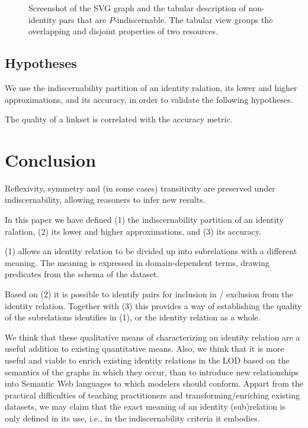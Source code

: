 \documentclass[letterpaper]{article}
\begin{document}
\begin{figure}
\label{fig:screenshot}
\caption{Screenshot of the SVG graph and the tabular description of non-identity pars that are $P$-indiscernable. The tabular view groups the overlapping and disjoint properties of two resources.}
\end{figure}

\subsection{Hypotheses}
\label{sec:hypotheses}

We use the indiscernability partition of an identity ralation, its lower and higher approximations, and its accuracy, in order to validate the following hypotheses.

The quality of a linkset is correlated with the accuracy metric.

\section{Conclusion}
\label{sec:conclusion}

Reflexivity, symmetry and (in some cases) transitivity are preserved under indiscernability, allowing reasoners to infer new results.

In this paper we have defined (1) the indiscernability partition of an identity ralation, (2) its lower and higher approximations, and (3) its accuracy.

(1) allows an identity relation to be divided up into subrelations with a different meaning. The meaning is expressed in domain-dependent terms, drawing predicates from the schema of the dataset.

Based on (2) it is possible to identify pairs for inclusion in / exclusion from the identity relation. Together with (3) this provides a way of establishing the quality of the subrelations identifies in (1), or the identity relation as a whole.

We think that these qualitative means of characterizing an identity relation are a useful addition to existing quantitative means. Also, we think that it is more useful and viable to enrich existing identity relations in the LOD based on the semantics of the graphs in which they occur, than to introduce new relationships into Semantic Web languages to which modelers should conform. Appart from the practical difficulties of teaching practitioners and transforming/enriching existing datasets, we may claim that the exact meaning of an identity (sub)relation is only defined in its use, i.e., in the indiscernability criteria it embodies.
\end{document}
